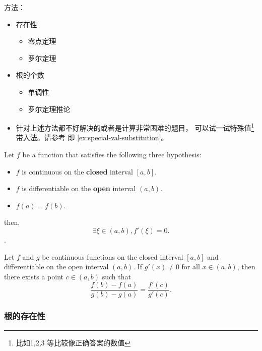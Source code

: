 方法：
\begin{itemize} 
    \item 存在性
    \begin{itemize}
        \item 零点定理
        \item 罗尔定理
    \end{itemize}

    \item 根的个数
    \begin{itemize}
        \item 单调性
        \item 罗尔定理推论
    \end{itemize}

    \item   针对上述方法都不好解决的或者是计算非常困难的题目，
            可以试一试特殊值\footnote{比如1,2,3 等比较像正确答案的数值}
            带入法。请参考 \cite[page 77, pdf 88, 例4]{we} 即
            \ref{ex:special-val-substitution}。

\end{itemize}

\begin{theorem}  \label{rolle-mean-value}
    Let $f$ be a function that satisfies the following three hypothesis:
    \begin{itemize}
        \item $f$ is continuous on the \textbf{closed} interval $[a, b]$.
        \item $f$ is differentiable on the \textbf{open} interval $(a, b)$.
        \item $f(a) = f(b)$.
    \end{itemize}
    then, 
    \[
        \exists \xi \in (a, b), f'(\xi) = 0.
    \]
    \cite[page 290, pdf 325]{stewart}.
\end{theorem}

\begin{theorem} \label{cauthy-mean-value}
    Let $f$ and $g$ be continuous functions on the closed interval $[a, b]$ and differentiable on the open interval $(a, b)$. If $g'(x) \neq 0$ for all $x \in (a, b)$, then there exists a point $c \in (a, b)$ such that
    \[
        \frac{f(b) - f(a)}{g(b) - g(a)} = \frac{f'(c)}{g'(c)}.
    \]
\end{theorem}

\subsubsection{根的存在性}

